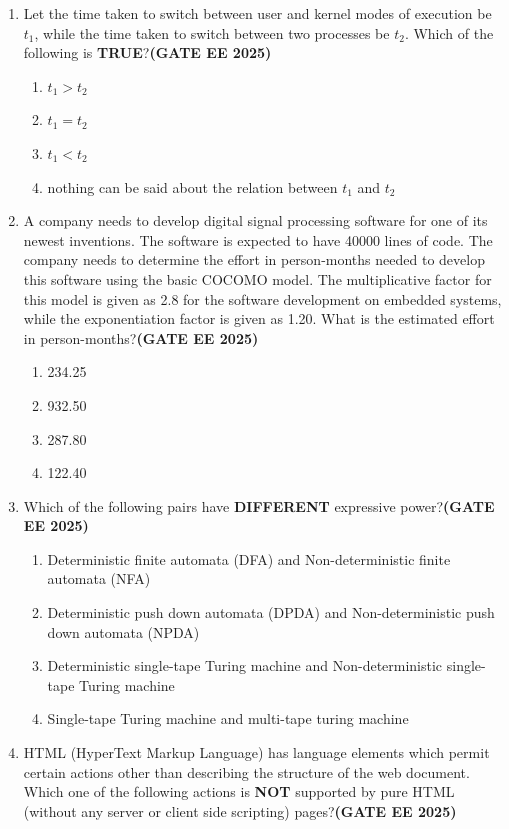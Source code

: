 \documentclass[journal,12pt,onecolumn]{IEEEtran}
\theoremstyle{remark}
\begin{document}
\begin{enumerate}
\item Let the time taken to switch between user and kernel modes of execution be $t_1$, while the time taken to switch between two processes be $t_2$. Which of the following is \textbf{TRUE}?\hfill \textbf{(GATE EE 2025)}
\begin{enumerate}
    \item $t_1 > t_2$
    \item $t_1 = t_2$
    \item $t_1 < t_2$
    \item nothing can be said about the relation between $t_1$ and $t_2$
\end{enumerate}

\item A company needs to develop digital signal processing software for one of its newest inventions. The software is expected to have 40000 lines of code. The company needs to determine the effort in person-months needed to develop this software using the basic COCOMO model. The multiplicative factor for this model is given as 2.8 for the software development on embedded systems, while the exponentiation factor is given as 1.20. What is the estimated effort in person-months?\hfill \textbf{(GATE EE 2025)}
\begin{enumerate}
    \item 234.25
    \item 932.50
    \item 287.80
    \item 122.40
\end{enumerate}

\item Which of the following pairs have \textbf{DIFFERENT} expressive power?\hfill \textbf{(GATE EE 2025)}
\begin{enumerate}
    \item Deterministic finite automata (DFA) and Non-deterministic finite automata (NFA)
    \item Deterministic push down automata (DPDA) and Non-deterministic push down automata (NPDA)
    \item Deterministic single-tape Turing machine and Non-deterministic single-tape Turing machine
    \item Single-tape Turing machine and multi-tape turing machine
\end{enumerate}


\item  HTML (HyperText Markup Language) has language elements which permit certain actions other than describing the structure of the web document. Which one of the following actions is \textbf{NOT} supported by pure HTML (without any server or client side scripting) pages?\hfill \textbf{(GATE EE 2025)}


\end{enumerate}
\end{document}
